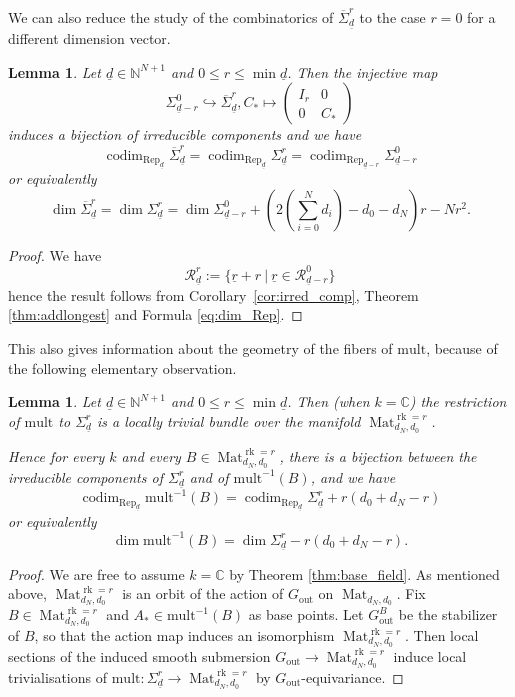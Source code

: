 \documentclass[a4paper]{amsart}
\DeclareMathOperator{\rk}{rk}
\DeclareMathOperator{\Rep}{\mathrm{Rep}}
\DeclareMathOperator{\Mat}{\mathrm{Mat}}
\DeclareMathOperator{\codim}{\mathrm{codim}}
\newcommand{\C}{\mathbb{C}}
\newcommand{\N}{\mathbb{N}}
\newcommand{\CR}{\mathcal{R}}
\newcommand{\ur}{\underline{r}}
\newcommand{\ud}{\underline{d}}
\newcommand{\out}{\mathrm{out}}
\newcommand{\mult}{\mathrm{mult}}
\newcommand{\cSigma}{\overline{\Sigma}}
\newtheorem{lemma}[thm]{Lemma}
\theoremstyle{plain}
\begin{document}
We can also reduce the study of the combinatorics of $\cSigma^r_{\ud}$ to the case $r=0$ for a different dimension vector.

\begin{lemma}\label{lem:rank_0}
   Let $\ud\in \N^{N+1}$ and $0\leq r\leq \min\ud$. Then the injective map 
   \[
   \Sigma^{0}_{\ud-r}\hookrightarrow \cSigma^r_{\ud}, C_*\mapsto \left(\begin{array}{cc}
       I_r & 0 \\
      0  & C_*
   \end{array} \right)
   \]
   induces a bijection of irreducible components and we have
   \[
   \codim_{\Rep_{\ud}} \cSigma^{r}_{\ud}=\codim_{\Rep_{\ud}} \Sigma^{r}_{\ud}= \codim_{\Rep_{\ud-r}} \Sigma^{0}_{\ud-r}
   \]
   or equivalently
   \[
   \dim\cSigma^{r}_{\ud}=\dim\Sigma^{r}_{\ud}= \dim\Sigma^{0}_{\ud-r} + \left(2\left(\sum_{i=0}^N d_i\right)-d_0-d_N\right)r-N r^2.
   \]
\end{lemma}
\begin{proof}
We have
\[
\CR_{\ud}^r:=\{\ur+r\ |\ \ur\in \CR^0_{\ud-r}\}
\]
hence the result follows from Corollary~\ref{cor:irred_comp}, Theorem \ref{thm:addlongest} and Formula \eqref{eq:dim_Rep}.
\end{proof}


This also gives information about the geometry of the fibers of $\mult$, because of the following elementary observation.

\begin{lemma}\label{lem:rank_vs_fibers}
Let $\ud\in \N^{N+1}$ and $0\leq r\leq \min\ud$. Then (when $k=\C$) the restriction of $\mult$ to $\Sigma^r_{\ud}$ is a locally trivial bundle over the manifold $\Mat_{d_N,d_0}^{\rk=r}$. 

Hence for every $k$ and every $B\in \Mat_{d_N,d_0}^{\rk=r}$, there is a bijection between the irreducible components of $\Sigma^r_{\ud}$ and of $\mult^{-1}(B)$, and we have
\[
 \codim_{\Rep_{\ud}} \mult^{-1}(B)= \codim_{\Rep_{\ud}}  \Sigma^r_{\ud} + r(d_0+d_N-r)
\]
or equivalently
\[
\dim \mult^{-1}(B)=\dim \Sigma^r_{\ud} - r(d_0+d_N-r).
\]
\end{lemma}
\begin{proof}
We are free to assume $k=\C$ by Theorem \ref{thm:base_field}. As mentioned above, $\Mat_{d_N,d_0}^{\rk=r}$ is an orbit of the action of $G_\out$ on $\Mat_{d_N,d_0}$. Fix $B\in\Mat_{d_N,d_0}^{\rk=r}$ and $A_*\in \mult^{-1}(B)$ as base points. Let $G^B_\out$ be the stabilizer of $B$, so that the action map induces an isomorphism $\Mat_{d_N,d_0}^{\rk=r}$. Then local sections of the induced smooth submersion $G_\out\to \Mat_{d_N,d_0}^{\rk=r}$ induce local trivialisations of $\mult:\Sigma^r_{\ud}\to \Mat_{d_N,d_0}^{\rk=r}$ by $G_\out$-equivariance.
\end{proof}
\end{document}
